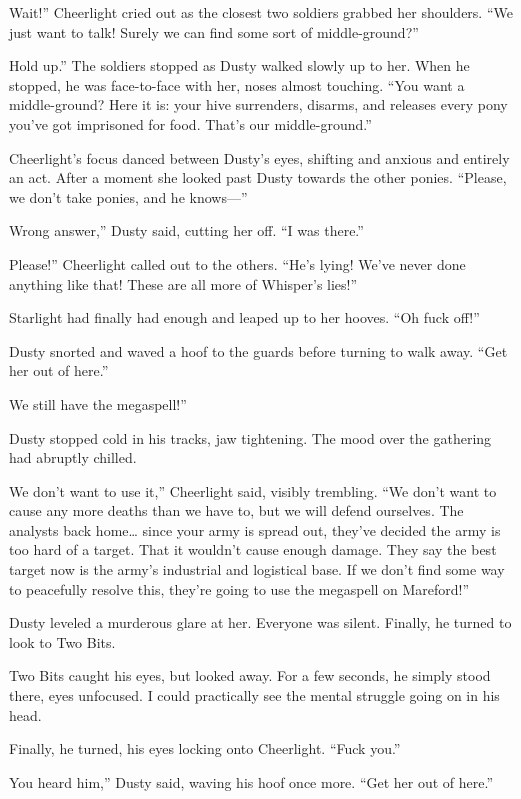 \leavevmode{}Wait!” Cheerlight cried out as the closest two soldiers grabbed her shoulders. “We just want to talk! Surely we can find some sort of middle-ground?”

\leavevmode{}Hold up.” The soldiers stopped as Dusty walked slowly up to her. When he stopped, he was face-to-face with her, noses almost touching. “You want a middle-ground? Here it is: your hive surrenders, disarms, and releases every pony you’ve got imprisoned for food. That’s our middle-ground.”

Cheerlight’s focus danced between Dusty’s eyes, shifting and anxious and entirely an act. After a moment she looked past Dusty towards the other ponies. “Please, we don’t take ponies, and he knows—”

\leavevmode{}Wrong answer,” Dusty said, cutting her off. “I was there.”

\leavevmode{}Please!” Cheerlight called out to the others. “He’s lying! We’ve never done anything like that! These are all more of Whisper’s lies!”

Starlight had finally had enough and leaped up to her hooves. “Oh fuck off!”

Dusty snorted and waved a hoof to the guards before turning to walk away. “Get her out of here.”

\leavevmode{}We still have the megaspell!”

Dusty stopped cold in his tracks, jaw tightening. The mood over the gathering had abruptly chilled.

\leavevmode{}We don’t want to use it,” Cheerlight said, visibly trembling. “We don’t want to cause any more deaths than we have to, but we will defend ourselves. The analysts back home… since your army is spread out, they’ve decided the army is too hard of a target. That it wouldn’t cause enough damage. They say the best target now is the army’s industrial and logistical base. If we don’t find some way to peacefully resolve this, they’re going to use the megaspell on Mareford!”

Dusty leveled a murderous glare at her. Everyone was silent. Finally, he turned to look to Two Bits.

Two Bits caught his eyes, but looked away. For a few seconds, he simply stood there, eyes unfocused. I could practically see the mental struggle going on in his head.

Finally, he turned, his eyes locking onto Cheerlight. “Fuck you.”

\leavevmode{}You heard him,” Dusty said, waving his hoof once more. “Get her out of here.”

